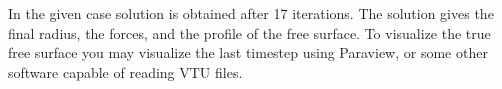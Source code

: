 In the given case solution is obtained after 17 iterations.
The solution gives the final radius, the forces, and the profile of the 
free surface. To visualize the true free surface you may visualize the
last timestep using Paraview, or some other software capable of reading
VTU files. 


\vfill
\mbox{}
